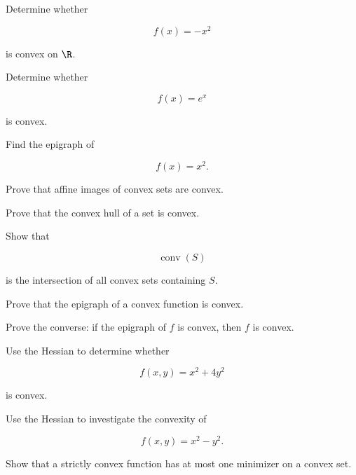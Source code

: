 \begin{exercise}[2]
Determine whether

\[
f(x)=-x^2
\]

is convex on \(\R\).
\end{exercise}

\begin{exercise}[2]
Determine whether

\[
f(x)=e^x
\]

is convex.
\end{exercise}

\begin{exercise}[2]
Find the epigraph of

\[
f(x)=x^2.
\]
\end{exercise}

\begin{exercise}[3]
Prove that affine images of convex sets are convex.
\end{exercise}

\begin{exercise}[3]
Prove that the convex hull of a set is convex.
\end{exercise}

\begin{exercise}[3]
Show that

\[
\operatorname{conv}(S)
\]

is the intersection of all convex sets containing \(S\).
\end{exercise}

\begin{exercise}[3]
Prove that the epigraph of a convex function is convex.
\end{exercise}

\begin{exercise}[3]
Prove the converse: if the epigraph of \(f\) is convex, then \(f\) is convex.
\end{exercise}

\begin{exercise}[3]
Use the Hessian to determine whether

\[
f(x,y)=x^2+4y^2
\]

is convex.
\end{exercise}

\begin{exercise}[3]
Use the Hessian to investigate the convexity of

\[
f(x,y)=x^2-y^2.
\]
\end{exercise}

\begin{exercise}[3]
Show that a strictly convex function has at most one minimizer on a convex
set.
\end{exercise}


